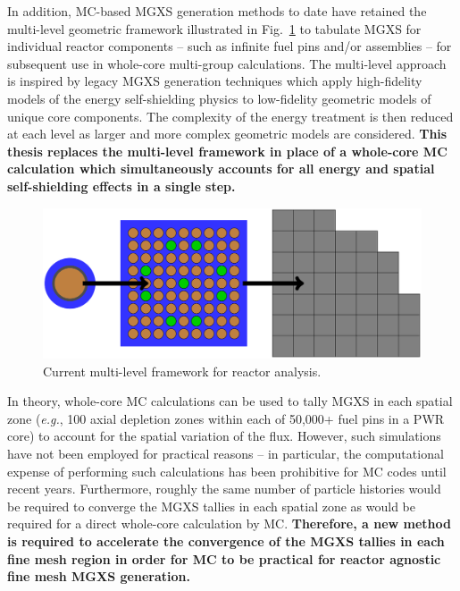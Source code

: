 \documentclass[12pt,twoside]{mitthesis-exec}
\begin{document}
In addition, MC-based MGXS generation methods to date have retained the multi-level geometric framework illustrated in Fig.~\ref{fig:multi-level-flow-chart} to tabulate MGXS for individual reactor components -- such as infinite fuel pins and/or assemblies -- for subsequent use in whole-core multi-group calculations. The multi-level approach is inspired by legacy MGXS generation techniques which apply high-fidelity models of the energy self-shielding physics to low-fidelity geometric models of unique core components. The complexity of the energy treatment is then reduced at each level as larger and more complex geometric models are considered. \textbf{This thesis replaces the multi-level framework in place of a whole-core MC calculation which simultaneously accounts for all energy and spatial self-shielding effects in a single step.}

\begin{figure}[h!]
\centering
\includegraphics[width=0.9\linewidth]{figures/intro/multi-step-flow-chart}
\caption[Multi-level approach to reactor analysis]{Current multi-level framework for reactor analysis.}
\label{fig:multi-level-flow-chart}
\end{figure}

In theory, whole-core MC calculations can be used to tally MGXS in each spatial zone (\textit{e.g.}, 100 axial depletion zones within each of 50,000+ fuel pins in a PWR core) to account for the spatial variation of the flux. However, such simulations have not been employed for practical reasons -- in particular, the computational expense of performing such calculations has been prohibitive for MC codes until recent years. Furthermore, roughly the same number of particle histories would be required to converge the MGXS tallies in each spatial zone as would be required for a direct whole-core calculation by MC. \textbf{Therefore, a new method is required to accelerate the convergence of the MGXS tallies in each fine mesh region in order for MC to be practical for reactor agnostic fine mesh MGXS generation.}
\end{document}
